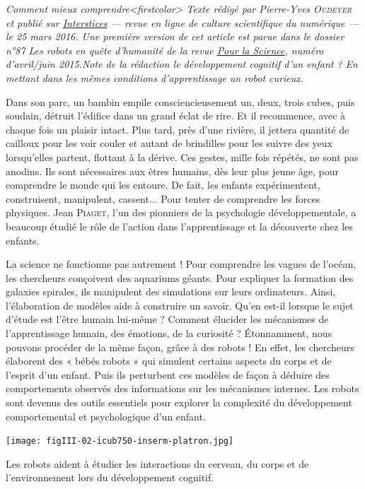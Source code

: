 \begingroup\itshape
Comment mieux comprendre\caution[t]<firstcolor>{%
\upshape Texte rédigé par Pierre-Yves \textsc{Oudeyer} et publié sur \href{https://interstices.info/leveil-des-bebes-robots/}{Interstices} --- revue en ligne de culture scientifique du numérique --- le 25 mars 2016. Une première version de cet article est parue dans le dossier n°87 Les robots en quête d’humanité de la revue \href{https://www.pourlascience.fr/index.php}{Pour la Science}, numéro d’avril/juin 2015.}{\upshape Note de la rédaction}
 le développement cognitif d’un enfant ? En mettant dans les mêmes conditions d’apprentissage un robot curieux.
\endgroup

Dans son parc, un bambin empile consciencieusement un, deux, trois cubes, puis soudain, détruit l’édifice dans un grand éclat de rire. Et il recommence, avec à chaque fois un plaisir intact. Plus tard, près d’une rivière, il jettera quantité de cailloux pour les voir couler et autant de brindilles pour les suivre des yeux lorsqu’elles partent, flottant à la dérive. Ces gestes, mille fois répétés, ne sont pas anodins. Ils sont nécessaires aux êtres humains, dès leur plus jeune âge, pour comprendre le monde qui les entoure. De fait, les enfants expérimentent, construisent, manipulent, cassent... Pour tenter de comprendre les forces physiques. Jean \textsc{Piaget}, l’un des pionniers de la psychologie développementale, a beaucoup étudié le rôle de l’action dans l’apprentissage et la découverte chez les enfants.

La science ne fonctionne pas autrement ! Pour comprendre les va\-gues de l’océan, les chercheurs conçoivent des aquariums géants. Pour expliquer la formation des galaxies spirales, ils manipulent des simulations sur leurs ordinateurs. Ainsi, l’élaboration de modèles aide à construire un savoir. Qu’en est-il lorsque le sujet d’étude est l’être humain lui-même ? Comment élucider les mécanismes de l’apprentissage humain, des émotions, de la curiosité ? Étonnamment, nous pouvons procéder de la même façon, grâce à des robots !
En effet, les chercheurs élaborent des « bébés robots » qui simulent certains aspects du corps et de l’esprit d’un enfant. Puis ils perturbent ces modèles de façon à déduire des comportements observés des informations sur les mécanismes internes. Les robots sont devenus des outils essentiels pour explorer la complexité du développement comportemental et psychologique d’un enfant.

\begin{jazzfigure*}
\texttt{[image: figIII-02-icub750-inserm-platron.jpg]}
\vspace{-10pt} %
\caption{\label{fig:III.2}Les robots aident à étudier les interactions du cerveau, du corps et de l’environnement lors du développement cognitif.}
\end{jazzfigure*}

